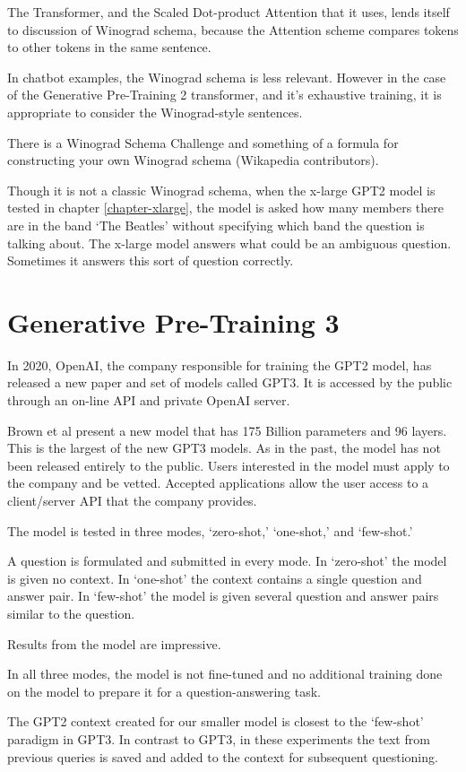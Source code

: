 The Transformer, and the Scaled Dot-product Attention that it uses, lends itself to discussion of Winograd schema, because the Attention scheme compares tokens to other tokens in the same sentence. 

In chatbot examples, the Winograd schema is less relevant. %
However in the case of the Generative Pre-Training 2 transformer, and it's exhaustive training, it is appropriate to consider the Winograd-style sentences.

There is a Winograd Schema Challenge and something of a formula for constructing your own Winograd schema (Wikapedia contributors). \cite{wiki:xxx}

Though it is not a classic Winograd schema, when the x-large GPT2 model is tested in chapter \ref{chapter-xlarge}, the model is asked how many members there are in the band `The Beatles' without specifying which band the question is talking about. The x-large model answers what could be an ambiguous question. Sometimes it answers this sort of question correctly.

\section{Generative Pre-Training 3}

\label{discussion-gpt3}

In 2020, OpenAI, the company responsible for training the GPT2 model, has released a new paper and set of models called GPT3. It is accessed by the public through an on-line API and private OpenAI server.

Brown et al \cite{brown2020language} present a new model that has 175 Billion parameters and 96 layers. This is the largest of the new GPT3 models. As in the past, the model has not been released entirely to the public. Users interested in the model must apply to the company and be vetted. Accepted applications allow the user access to a client/server API that the company provides.

The model is tested in three modes, `zero-shot,' `one-shot,' and `few-shot.' 

A question is formulated and submitted in every mode. In `zero-shot' the model is given no  context. In `one-shot' the context contains a single question and answer pair. In `few-shot' the model is given several question and answer pairs similar to the question.

Results from the model are impressive. 

In all three modes, the model is not fine-tuned and no additional training done on the model to prepare it for a question-answering task.

The GPT2 context created for our smaller model is closest to the `few-shot' paradigm in GPT3. In contrast to GPT3, in these experiments the text from previous queries is saved and added to the context for subsequent questioning.

